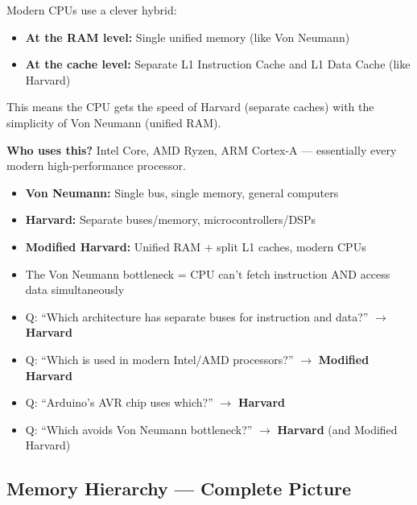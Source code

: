 \documentclass[11pt,a4paper]{article}
\newcommand{\highlight}[1]{\colorbox{yellow!50}{\textbf{#1}}}
\begin{document}
Modern CPUs use a clever hybrid:
\begin{itemize}[noitemsep]
  \item \textbf{At the RAM level:} Single unified memory (like Von Neumann)
  \item \textbf{At the cache level:} Separate L1 Instruction Cache and L1 Data Cache (like Harvard)
\end{itemize}

This means the CPU gets the speed of Harvard (separate caches) with the simplicity of Von Neumann (unified RAM).

\textbf{Who uses this?} Intel Core, AMD Ryzen, ARM Cortex-A --- essentially every modern high-performance processor.

\begin{keypoint}
\begin{itemize}[noitemsep]
  \item \textbf{Von Neumann:} Single bus, single memory, general computers
  \item \textbf{Harvard:} Separate buses/memory, microcontrollers/DSPs
  \item \textbf{Modified Harvard:} Unified RAM + split L1 caches, modern CPUs
  \item The Von Neumann bottleneck = CPU can't fetch instruction AND access data simultaneously
\end{itemize}
\end{keypoint}

\begin{mcqtrap}
\begin{itemize}[noitemsep]
  \item Q: ``Which architecture has separate buses for instruction and data?'' $\to$ \highlight{Harvard}
  \item Q: ``Which is used in modern Intel/AMD processors?'' $\to$ \highlight{Modified Harvard}
  \item Q: ``Arduino's AVR chip uses which?'' $\to$ \highlight{Harvard}
  \item Q: ``Which avoids Von Neumann bottleneck?'' $\to$ \highlight{Harvard} (and Modified Harvard)
\end{itemize}
\end{mcqtrap}

\subsection{Memory Hierarchy --- Complete Picture}
\end{document}

